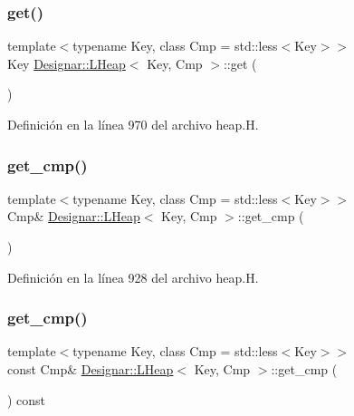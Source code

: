 \subsubsection{\texorpdfstring{get()}{get()}}
{\footnotesize\ttfamily template$<$typename Key, class Cmp = std\+::less$<$\+Key$>$$>$ \\
Key \hyperlink{class_designar_1_1_l_heap}{Designar\+::\+L\+Heap}$<$ Key, Cmp $>$\+::get (\begin{DoxyParamCaption}{ }\end{DoxyParamCaption})\hspace{0.3cm}{\ttfamily [inline]}}



Definición en la línea 970 del archivo heap.\+H.

\mbox{\label{class_designar_1_1_l_heap_a2c704057a03ec82052cf916142709506}} 
\subsubsection{\texorpdfstring{get\+\_\+cmp()}{get\_cmp()}\hspace{0.1cm}{\footnotesize\ttfamily [1/2]}}
{\footnotesize\ttfamily template$<$typename Key, class Cmp = std\+::less$<$\+Key$>$$>$ \\
Cmp\& \hyperlink{class_designar_1_1_l_heap}{Designar\+::\+L\+Heap}$<$ Key, Cmp $>$\+::get\+\_\+cmp (\begin{DoxyParamCaption}{ }\end{DoxyParamCaption})\hspace{0.3cm}{\ttfamily [inline]}}



Definición en la línea 928 del archivo heap.\+H.

\mbox{\label{class_designar_1_1_l_heap_a2cb81067a531983f16aba240cd2dcde5}} 
\subsubsection{\texorpdfstring{get\+\_\+cmp()}{get\_cmp()}\hspace{0.1cm}{\footnotesize\ttfamily [2/2]}}
{\footnotesize\ttfamily template$<$typename Key, class Cmp = std\+::less$<$\+Key$>$$>$ \\
const Cmp\& \hyperlink{class_designar_1_1_l_heap}{Designar\+::\+L\+Heap}$<$ Key, Cmp $>$\+::get\+\_\+cmp (\begin{DoxyParamCaption}{ }\end{DoxyParamCaption}) const\hspace{0.3cm}{\ttfamily [inline]}}



